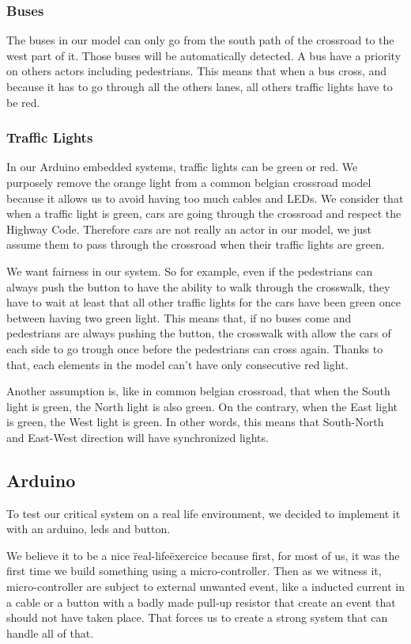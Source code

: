 \subsubsection{Buses}
The buses in our model can only go from the south path of the crossroad to the west part of it. Those buses will be automatically detected. A bus have a priority on others actors including pedestrians. This means that when a bus cross, and because it has to go through all the others lanes, all others traffic lights have to be red.

\subsubsection{Traffic Lights}
In our Arduino embedded systems, traffic lights can be green or red. We purposely remove the orange light from a common belgian crossroad model because it allows us to avoid having too much cables and LEDs. We consider that when a traffic light is green, cars are going through the crossroad and respect the Highway Code. Therefore cars are not really an actor in our model, we just assume them to pass through the crossroad when their traffic lights are green. 

We want fairness in our system. So for example, even if the pedestrians can always push the button to have the ability to walk through the crosswalk, they have to wait at least that all other traffic lights for the cars have been green once between having two green light. This means that, if no buses come and pedestrians are always pushing the button, the crosswalk with allow the cars of each side to go trough once before the pedestrians can cross again. Thanks to that, each elements in the model can't have only consecutive red light.

Another assumption is, like in common belgian crossroad, that when the South light is green, the North light is also green. On the contrary, when the East light is green, the West light is green. In other words, this means that South-North and East-West direction will have synchronized lights.


\subsection{Arduino}

To test our critical system on a real life environment, we decided to implement it with an arduino, leds and button.

We believe it to be a nice \"real-life\" exercice because first, for most of us, it was the first time we build something using a micro-controller. Then as we witness it, micro-controller are subject to external unwanted event, like a inducted current in a cable or a button with a badly made pull-up resistor that create an event that should not have taken place. That forces us to create a strong system that can handle all of that.
